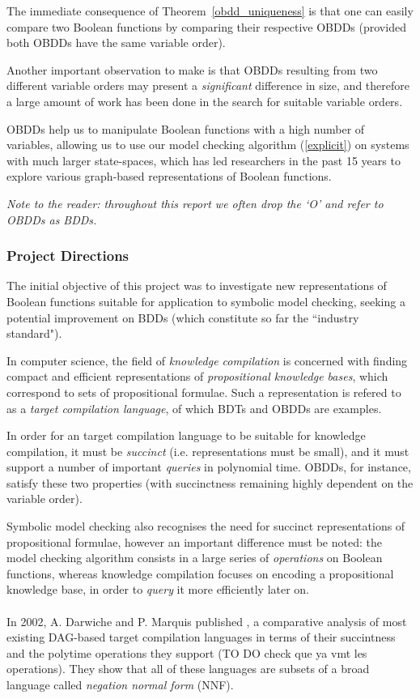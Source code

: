 \documentclass[11pt]{article}
\begin{document}
The immediate consequence of Theorem~\ref{obdd_uniqueness} is that one can easily compare two Boolean functions by comparing their respective OBDDs (provided both OBDDs have the same variable order). 

Another important observation to make is that OBDDs resulting from two different variable orders may present a \textit{significant }difference in size, and therefore a large amount of work has been done in the search for suitable variable orders. 

OBDDs help us to manipulate Boolean functions with a high number of variables, allowing us to use our model checking algorithm (\ref{explicit}) on systems with much larger state-spaces, which has led researchers in the past 15 years to explore various graph-based representations of Boolean functions.

\noindent\textit{Note to the reader: throughout this report we often drop the `O' and refer to OBDDs as BDDs.}

\subsubsection{Project Directions}

The initial objective of this project was to investigate new representations of Boolean functions suitable for application to symbolic model checking, seeking a potential improvement on BDDs (which constitute so far the ``industry standard").

In computer science, the field of \textit{knowledge compilation} is concerned with finding compact and efficient representations of \textit{propositional knowledge bases}, which correspond to sets of propositional formulae.
Such a representation is refered to as a \textit{target compilation language}, of which BDTs and OBDDs are examples. 
 
In order for an target compilation language to be suitable for knowledge compilation, it must be \textit{succinct} (i.e. representations must be small), and it must support a number of important \textit{queries} in polynomial time. OBDDs, for instance, satisfy these two properties (with succinctness remaining highly dependent on the variable order).

Symbolic model checking also recognises the need for succinct representations of propositional formulae, however an important difference must be noted: the model checking algorithm consists in a large series of \textit{operations} on Boolean functions, whereas knowledge compilation focuses on encoding a propositional knowledge base, in order to \textit{query} it more efficiently later on. 
\\\\
 In 2002, A. Darwiche and P. Marquis published \cite{compilation_map}, a comparative analysis of most existing DAG-based target compilation languages in terms of their succintness and the polytime operations they support (TO DO check que ya vmt les operations). They show that all of these languages are subsets of a broad language called \textit{negation normal form} (NNF). 
\end{document}
